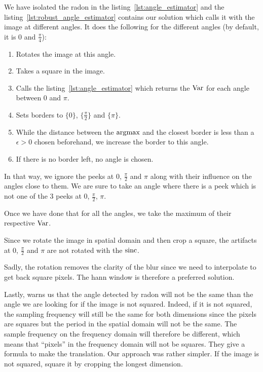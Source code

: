 We have isolated the radon in
the listing~\ref{lst:angle_estimator} and
the listing~\ref{lst:robust_angle_estimator} contains
our solution which calls it with the image at different
angles.
It does the following for the different angles
(by default, it is 0 and $\frac{\pi}{4}$):
\begin{enumerate}
  \item Rotates the image at this angle.
  \item Takes a square in the image.
  \item Calls the listing~\ref{lst:angle_estimator} which
    returns the $\operatorname{Var}$ for each angle between 0 and $\pi$.
  \item Sets borders to $\{0\}$, $\{\frac{\pi}{2}\}$
    and $\{\pi\}$.
  \item While the distance between the $\operatorname{argmax}$ and the
    closest border is less than a $\epsilon > 0$ chosen
    beforehand, we increase the border to this angle.
  \item If there is no border left, no angle is chosen.
\end{enumerate}
In that way, we ignore the peeks at $0$, $\frac{\pi}{2}$
and $\pi$ along with their influence on the angles
close to them.
We are sure to take an angle where there is a peek
which is not one of the 3 peeks at 0, $\frac{\pi}{2}$, $\pi$.

Once we have done that for all the angles,
we take the maximum of their respective $\operatorname{Var}$.

Since we rotate the image in spatial domain and then crop
a square, the artifacts at 0, $\frac{\pi}{2}$ and $\pi$ are
not rotated with the $\operatorname{sinc}$.

Sadly, the rotation removes the clarity of the blur since
we need to interpolate to get back square pixels.
The hann window is therefore a preferred solution.

Lastly, \cite{krahmer2006blind} warns us that the angle
detected by radon will not be the same than the angle
we are looking for if the image is not squared.
Indeed, if it is not squared, the sampling frequency
will still be the same for both dimensions since
the pixels are squares but the period
in the spatial domain will not be the same.
The sample frequency on the frequency domain will therefore
be different, which means that ``pixels'' in the frequency
domain will not be squares.
They give a formula to make the translation.
Our approach was rather simpler.
If the image is not squared, square it by cropping the
longest dimension.

